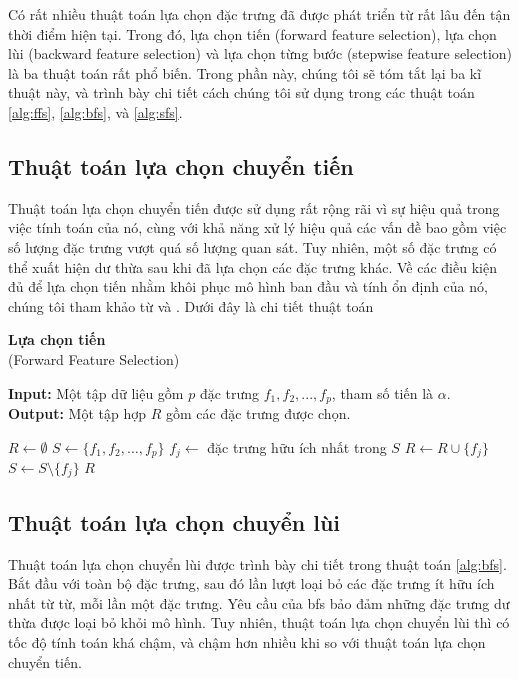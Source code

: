 Có rất nhiều thuật toán lựa chọn đặc trưng đã được phát triển từ rất lâu đến tận thời điểm hiện tại. Trong đó, lựa chọn tiến (forward feature selection), lựa chọn lùi (backward feature selection) và lựa chọn từng bước (stepwise feature selection) là ba thuật toán rất phổ biến. Trong phần này, chúng tôi sẽ tóm tắt lại ba kĩ thuật này, và trình bày chi tiết cách chúng tôi sử dụng trong các thuật toán \ref{alg:ffs}, \ref{alg:bfs}, và \ref{alg:sfs}.

\subsection{Thuật toán lựa chọn chuyển tiến}
Thuật toán lựa chọn chuyển tiến được sử dụng rất rộng rãi vì sự hiệu quả trong việc tính toán của nó, cùng với khả năng xử lý hiệu quả các vấn đề bao gồm việc số lượng đặc trưng vượt quá số lượng quan sát. Tuy nhiên, một số đặc trưng có thể xuất hiện dư thừa sau khi đã lựa chọn các đặc trưng khác. Về các điều kiện đủ để lựa chọn tiến nhằm khôi phục mô hình ban đầu và tính ổn định của nó, chúng tôi tham khảo từ \cite{tropp2004greed} và \cite{donoho2005stable}. Dưới đây là chi tiết thuật toán

\begin{breakablealgorithm}
	\caption{\textbf{Lựa chọn tiến}\\
		(Forward Feature Selection)}\label{alg:ffs}
	\noindent\textbf{Input:} Một tập dữ liệu gồm $p$ đặc trưng $f_1,f_2,...,f_p$, tham số tiến là $\alpha$.\\
	\textbf{Output:} Một tập hợp $R$ gồm các đặc trưng được chọn.
	\begin{algorithmic}[1]
		\State $R \gets \emptyset$
		\State $S \gets \{f_1, f_2,\ldots, f_p\}$
		\State $f_j \gets$ đặc trưng hữu ích nhất trong $S$
		\State $R \gets R \cup \{f_j\}$
		\State $S \gets S\setminus \{f_j\}$
		\Else
		\State \Return $R$
		\EndIf
		\EndWhile
	\end{algorithmic}
\end{breakablealgorithm}

\subsection{Thuật toán lựa chọn chuyển lùi}
Thuật toán lựa chọn chuyển lùi \cite{james2013introduction} được trình bày chi tiết trong thuật toán \ref{alg:bfs}. Bắt đầu với toàn bộ đặc trưng, sau đó lần lượt loại bỏ các đặc trưng ít hữu ích nhất từ từ, mỗi lần một đặc trưng. Yêu cầu của bfs bảo đảm những đặc trưng dư thừa được loại bỏ khỏi mô hình. Tuy nhiên, thuật toán lựa chọn chuyển lùi thì có tốc độ tính toán khá chậm, và chậm hơn nhiều khi so với thuật toán lựa chọn chuyển tiến.

